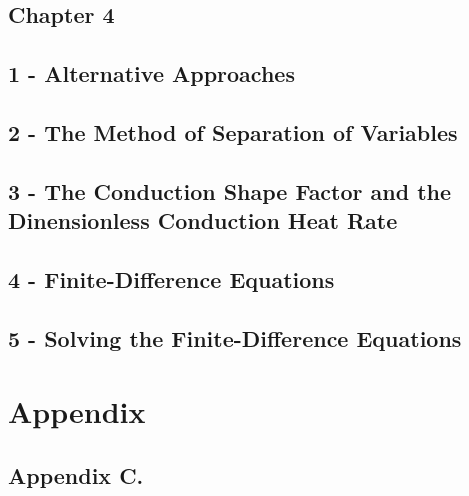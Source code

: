 \documentclass[10pt,landscape]{article}
\newenvironment{Figure}
     {\par\medskip\noindent\minipage{\linewidth}}
     {\endminipage\par\medskip}
\begin{document}
\begin{multicols}{3}
\subsection{Chapter 4}
\subsection{1 - Alternative Approaches}
\subsection{2 - The Method of Separation of Variables}
\subsection{3 - The Conduction Shape Factor and the Dinensionless Conduction Heat Rate}
\subsection{4 - Finite-Difference Equations}
\subsection{5 - Solving the Finite-Difference Equations}






\section{Appendix}
\subsection{Appendix C.}


%
%

\end{multicols}
\end{document}
